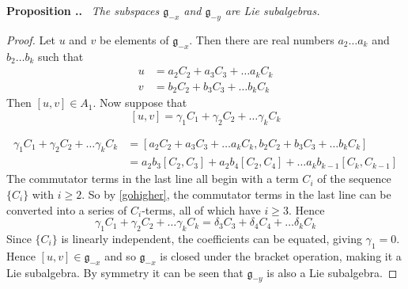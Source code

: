 \documentclass[honours]{UNSWthesis}
\newcommand{\g}{\mathfrak{g}}
\newcommand{\1}{\mathbf{e}_{1}}
\newcommand{\2}{\mathbf{e}_{3}}
\newcommand{\3}{\mathbf{e}_{3}}
\newcounter{Item}[section]
\newenvironment{Proposition}{\medskip
                            \refstepcounter{Item}
                            \noindent
                           {\bf Proposition \thesection.\theItem.}\ %
                            \begingroup \sl}
                           {\endgroup\medskip}
\begin{document}
\begin{Proposition} The subspaces $\g_{-x}$ and $\g_{-y}$ are Lie subalgebras.
\end{Proposition} 
\begin{proof}
Let $u$ and $v$ be elements of $\g_{-x}$. Then there are real numbers $a_{2}\ldots a_{k}$ and $b_{2} \ldots b_{k}$ such that 
\begin{align*}
u &= a_{2}C_{2}+ a_{3}C_{3} + \ldots a_{k}C_{k} \\
v &= b_{2}C_{2}+ b_{3}C_{3} + \ldots b_{k}C_{k}
\end{align*}
Then $[u,v]\in A_{1}$. Now suppose that 
\[
[u,v]=\gamma_{1}C_{1}+\gamma_{2}C_{2}+\ldots \gamma_{k}C_{k}
\]

\begin{align*}
\gamma_{1}C_{1}+\gamma_{2}C_{2}+\ldots \gamma_{k}C_{k}&=[a_{2}C_{2}+ a_{3}C_{3} + \ldots a_{k}C_{k},b_{2}C_{2}+ b_{3}C_{3} + \ldots b_{k}C_{k}] \\
&=a_{2}b_{3}[C_{2},C_{3}]+a_{2}b_{4}[C_{2},C_{4}]+\ldots a_{k}b_{k-1}[C_{k},C_{k-1}]
\end{align*}
The commutator terms in the last line all begin with a term $C_{i}$ of the sequence $\{C_{i} \}$ with $i \geq 2$. So by \ref{gohigher}, the commutator terms in the last line can be converted into a series of $C_{i}$-terms, all of which have $i \geq 3$. Hence
\[
\gamma_{1}C_{1}+\gamma_{2}C_{2}+\ldots \gamma_{k}C_{k} =\delta_{3}C_{3}+\delta_{4}C_{4}+\ldots \delta_{k}C_{k} 
\]
Since $\{ C_{i} \}$ is linearly independent, the coefficients can be equated, giving $\gamma_{1}=0$. Hence $[u,v] \in \g_{-x}$ and so $\g_{-x}$ is closed under the bracket operation, making it a Lie subalgebra. By symmetry it can be seen that $\g_{-y}$ is also a Lie subalgebra.
\end{proof}
\end{document}
